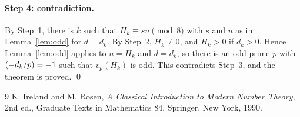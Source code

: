 \documentclass[11pt]{article}
\newcommand{\leg}[2]{\mathchoice{\biggl(\dfrac{#1}{#2}\biggr)}{(#1/#2)}{(#1/#2)}{(#1/#2)}}
\begin{document}
\enlargethispage{5\baselineskip}
\paragraph{Step 4: contradiction.} By Step~1, there is $k$ such that $H_k\equiv su\pmod{8}$ with $s$ and $u$ as in Lemma~\ref{lem:odd} for $d=d_k$. By Step~2, $H_k\neq0$, and $H_k>0$ if $d_k>0$. Hence Lemma~\ref{lem:odd} applies to $n=H_k$ and $d=d_k$, so there is an odd prime $p$ with $\leg{-d_k}{p}=-1$ such that $v_p(H_k)$ is odd. This contradicts Step~3, and the theorem is proved.
\qed

\begin{thebibliography}{9}
 K. Ireland and M. Rosen, \emph{A Classical Introduction to Modern Number Theory}, 2nd ed., Graduate Texts in Mathematics 84, Springer, New York, 1990.
\end{thebibliography}
\end{document}
